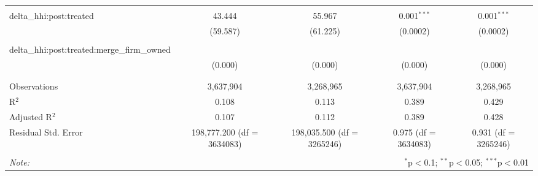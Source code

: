 \begin{table}[H]
{\begin{tabular}{@{\extracolsep{5pt}}lcccc}
   & & & & \\  

  delta\_hhi:post:treated & 43.444 & 55.967 & 0.001$^{***}$ & 0.001$^{***}$ \\  

   & (59.587) & (61.225) & (0.0002) & (0.0002) \\  

   & & & & \\  

  delta\_hhi:post:treated:merge\_firm\_owned &  &  &  &  \\  

   & (0.000) & (0.000) & (0.000) & (0.000) \\  

   & & & & \\  

 \hline \\[-1.8ex]  

 Observations & 3,637,904 & 3,268,965 & 3,637,904 & 3,268,965 \\  

 R$^{2}$ & 0.108 & 0.113 & 0.389 & 0.429 \\  

 Adjusted R$^{2}$ & 0.107 & 0.112 & 0.389 & 0.428 \\  

 Residual Std. Error & 198,777.200 (df = 3634083) & 198,035.500 (df = 3265246) & 0.975 (df = 3634083) & 0.931 (df = 3265246) \\  

 \hline  

 \hline \\[-1.8ex]  

 \textit{Note:}  & \multicolumn{4}{r}{$^{*}$p$<$0.1; $^{**}$p$<$0.05; $^{***}$p$<$0.01} \\  

 \end{tabular}}  

 \end{table}  

 




